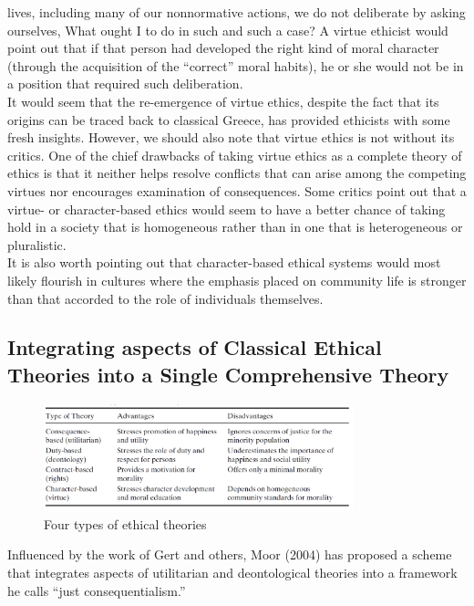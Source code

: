 \documentclass[12pt]{article}
\theoremstyle{definition}
\begin{document}
lives, including many of our nonnormative actions, we do not deliberate by asking
ourselves, What ought I to do in such and such a case? A
virtue ethicist would point out that if that person had developed the right kind of moral
character (through the acquisition of the “correct” moral habits), he or she would not be
in a position that required such deliberation.\\
It would seem that the re-emergence of virtue ethics, despite the fact that its origins
can be traced back to classical Greece, has provided ethicists with some fresh insights.
However, we should also note that virtue ethics is not without its critics. One of the chief
drawbacks of taking virtue ethics as a complete theory of ethics is that it neither helps
resolve conflicts that can arise among the competing virtues nor encourages examination
of consequences. Some critics point out that a virtue- or character-based ethics would
seem to have a better chance of taking hold in a society that is homogeneous rather than
in one that is heterogeneous or pluralistic.\\
It is also worth pointing out that character-based ethical systems would most
likely flourish in cultures where the emphasis placed on community life is stronger
than that accorded to the role of individuals themselves.
\subsection{Integrating aspects of Classical Ethical Theories into a Single Comprehensive Theory}
\begin{figure}[h]
\centering
\includegraphics[width=0.8\textwidth]{5.png}
\caption{Four types of ethical theories}
\end{figure}
Influenced by the work of Gert and others, Moor (2004) has proposed a scheme that
integrates aspects of utilitarian and deontological theories into a framework he calls “just
consequentialism.” 
\end{document}
